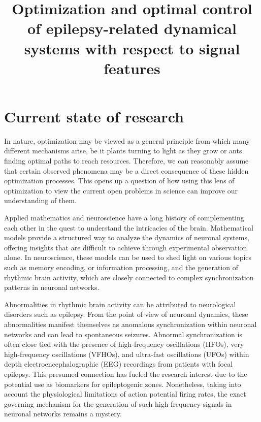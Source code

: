 \documentclass[a4paper,11pt]{scrartcl}
\title{Optimization and optimal control of epilepsy-related dynamical systems with respect to signal features}
\begin{document}
\maketitle
\tableofcontents

\newpage

\section{Current state of research}\label{sec:state}

In nature, optimization may be viewed as a general principle from which many different mechanisms arise, be it plants turning to light as they grow or ants finding optimal paths to reach resources. Therefore, we can reasonably assume that certain observed phenomena may be a direct consequence of these hidden optimization processes. This opens up a question of how using this lens of optimization to view the current open problems in science can improve our understanding of them. 

Applied mathematics and neuroscience have a long history of complementing each other in the quest to understand the intricacies of the brain. Mathematical models provide a structured way to analyze the dynamics of neuronal systems, offering insights that are difficult to achieve through experimental observation alone. In neuroscience, these models can be used to shed light on various topics such as memory encoding, or information processing, and the generation of rhythmic brain activity, which are closely connected to complex synchronization patterns in neuronal networks. 

Abnormalities in rhythmic brain activity can be attributed to neurological disorders such as epilepsy. From the point of view of neuronal dynamics, these abnormalities manifest themselves as anomalous synchronization within neuronal networks and can lead to spontaneous seizures. Abnormal synchronization is often close tied with the presence of high-frequency oscillations (HFOs), very high-frequency oscillations (VFHOs), and ultra-fast oscillations (UFOs) within depth electroencephalographic (EEG) recordings from patients with focal epilepsy. This presumed connection has fueled the research interest due to the potential use as biomarkers for epileptogenic zones. Nonetheless, taking into account the physiological limitations of action potential firing rates, the exact governing mechanism for the generation of such high-frequency signals in neuronal networks remains a mystery.
\end{document}
